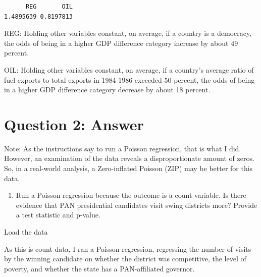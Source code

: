 \documentclass[12pt,letterpaper]{article}
\begin{document}


\begin{verbatim}
      REG       OIL 
1.4895639 0.8197813 
\end{verbatim}

\noindent REG: Holding other variables constant, on average, if a country is a democracy, the odds of being in a higher GDP difference category increase by about 49 percent.

\vspace{.25cm}

\noindent OIL: Holding other variables constant, on average, if a country's average ratio of fuel exports to total exports in 1984-1986 exceeded 50 percent, the odds of being in a higher GDP difference category decrease by about 18 percent.

\section*{Question 2: Answer}

\noindent Note: As the instructions say to run a Poisson regression, that is what I did. However, an examination of the data reveals a disproportionate amount of zeros. So, in a real-world analysis, a Zero-inflated Poisson (ZIP) may be better for this data.

\begin{enumerate}
	\item [(a)] Run a Poisson regression because the outcome is a count variable. Is there evidence that PAN presidential candidates visit swing districts more? Provide a test statistic and p-value.
\end{enumerate}

\noindent Load the data



\noindent As this is count data, I ran a Poisson regression, regressing the number of visits by the winning candidate on whether the district was competitive, the level of poverty, and whether the state has a PAN-affiliated governor. 


\end{document}
